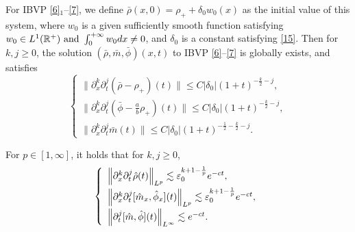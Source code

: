 \documentclass[10pt,a4paper]{amsart}
\begin{document}
\begin{lemma}\label{l3.1}
 For IBVP \eqref{6}$_1$--\eqref{7}, we define $\bar{\rho}(x,0)=\rho_{+}+\delta_{0}w_0(x)$ as the initial value of this system, where $w_{0}$ is a given sufficiently smooth function satisfying  $w_{0}\in L^{1}(\mathbb{R}^{+})~ \mbox{and} ~\int_{0}^{+\infty}w_{0} {\rm d}x\neq0$, and $\delta_{0}$ is a constant satisfying \eqref{15}.
 Then for $k,j\geq 0$, the solution $(\bar{\rho},\bar{m}, \bar\phi)(x,t)$ to IBVP \eqref{6}--\eqref{7}  is 
 globally exists, and satisfies
\begin{equation}\label{3.15}
 \left\{\begin{array}{l}
\|\partial^{k}_{x}\partial^{j}_{t}(\bar{\rho}-\rho_{+})(t)\|\leq C|\delta_{0}|(1+t)^{-\frac{k}{2}-j},\\[2mm]
\|\partial^{k}_{x}\partial^{j}_{t}(\bar{\phi}-\frac{a}{b}\rho_{+})(t)\|\leq C|\delta_{0}|(1+t)^{-\frac{k}{2}-j},\\[2mm]
\|\partial^{k}_{x}\partial^{j}_{t}\bar{m}(t)\|\leq C|\delta_{0}|(1+t)^{-\frac{1}{2}-\frac{k}{2}-j}.
  \end{array}\right.
\end{equation}
\end{lemma}

\begin{lemma}\label{l3.2}
 For $p \in [1, \infty]$, it holds that for $k, j \geq 0$,
 \begin{equation}\label{3.25}
 \left\{\begin{array}{l}
    \left\|\partial_{x}^{k} \partial_{t}^{j} \hat{\rho}(t)\right\|_{L^{p}}\lesssim\varepsilon_{0}^{k+1-\frac{1}{p}} {\rm e}^{-ct}, \\[2mm]
    \left\|\partial_{x}^{k} \partial_{t}^{j} [\hat{m}_x,\hat{\phi}_x](t)\right\|_{L^{p}}\lesssim\varepsilon_{0}^{k+1-\frac{1}{p}}{\rm e}^{-ct}, \\[2mm]
    \left\|\partial_{t}^{j}[\hat{m},\hat{\phi}](t)\right\|_{L^{\infty}}\lesssim{\rm e}^{-ct}.
\end{array}\right.
\end{equation}
\end{lemma}
\end{document}
